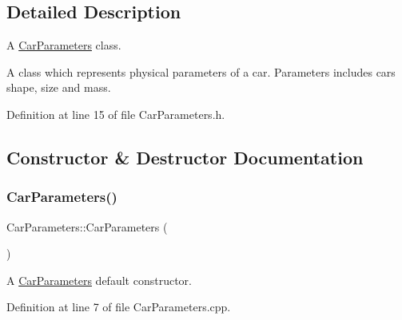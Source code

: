 \subsection{Detailed Description}
A \hyperlink{classCarParameters}{Car\+Parameters} class. 

A class which represents physical parameters of a car. Parameters includes car\textquotesingle{}s shape, size and mass. 

Definition at line 15 of file Car\+Parameters.\+h.



\subsection{Constructor \& Destructor Documentation}
\mbox{\label{classCarParameters_a188ab05105e5d379744f2fec14d51650}} 
\subsubsection{\texorpdfstring{Car\+Parameters()}{CarParameters()}\hspace{0.1cm}{\footnotesize\ttfamily [1/3]}}
{\footnotesize\ttfamily Car\+Parameters\+::\+Car\+Parameters (\begin{DoxyParamCaption}{ }\end{DoxyParamCaption})}



A \hyperlink{classCarParameters}{Car\+Parameters} default constructor. 



Definition at line 7 of file Car\+Parameters.\+cpp.


